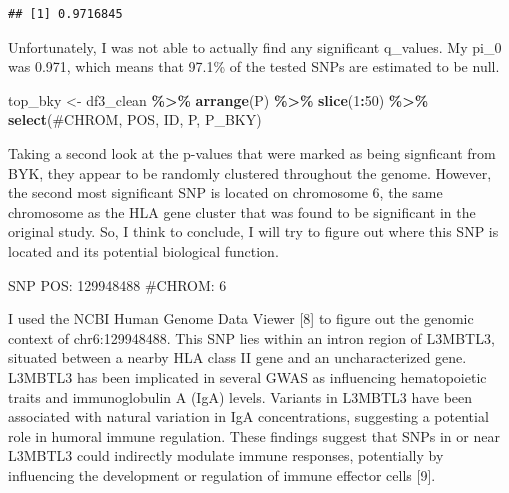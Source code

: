 \documentclass[
  12pt,
]{article}
\newenvironment{Shaded}{\begin{snugshade}}{\end{snugshade}}
\newcommand{\AttributeTok}[1]{\textcolor[rgb]{0.13,0.29,0.53}{#1}}
\newcommand{\DecValTok}[1]{\textcolor[rgb]{0.00,0.00,0.81}{#1}}
\newcommand{\FunctionTok}[1]{\textcolor[rgb]{0.13,0.29,0.53}{\textbf{#1}}}
\newcommand{\NormalTok}[1]{#1}
\newcommand{\OtherTok}[1]{\textcolor[rgb]{0.56,0.35,0.01}{#1}}
\newcommand{\SpecialCharTok}[1]{\textcolor[rgb]{0.81,0.36,0.00}{\textbf{#1}}}
\newcommand{\StringTok}[1]{\textcolor[rgb]{0.31,0.60,0.02}{#1}}
\begin{document}
\begin{Shaded}
\end{Shaded}

\begin{verbatim}
## [1] 0.9716845
\end{verbatim}

Unfortunately, I was not able to actually find any significant
q\_values. My pi\_0 was 0.971, which means that 97.1\% of the tested
SNPs are estimated to be null.

\begin{Shaded}
\begin{Highlighting}[]
\NormalTok{top\_bky }\OtherTok{\textless{}{-}}\NormalTok{ df3\_clean }\SpecialCharTok{\%\textgreater{}\%}
  \FunctionTok{arrange}\NormalTok{(P) }\SpecialCharTok{\%\textgreater{}\%}
  \FunctionTok{slice}\NormalTok{(}\DecValTok{1}\SpecialCharTok{:}\DecValTok{50}\NormalTok{) }\SpecialCharTok{\%\textgreater{}\%}
  \FunctionTok{select}\NormalTok{(}\StringTok{\textasciigrave{}}\AttributeTok{\#CHROM}\StringTok{\textasciigrave{}}\NormalTok{, POS, ID, P, P\_BKY)}
\end{Highlighting}
\end{Shaded}

Taking a second look at the p-values that were marked as being
signficant from BYK, they appear to be randomly clustered throughout the
genome. However, the second most significant SNP is located on
chromosome 6, the same chromosome as the HLA gene cluster that was found
to be significant in the original study. So, I think to conclude, I will
try to figure out where this SNP is located and its potential biological
function.

SNP POS: 129948488 \#CHROM: 6

I used the NCBI Human Genome Data Viewer {[}8{]} to figure out the
genomic context of chr6:129948488. This SNP lies within an intron region
of L3MBTL3, situated between a nearby HLA class II gene and an
uncharacterized gene. L3MBTL3 has been implicated in several GWAS as
influencing hematopoietic traits and immunoglobulin A (IgA) levels.
Variants in L3MBTL3 have been associated with natural variation in IgA
concentrations, suggesting a potential role in humoral immune
regulation. These findings suggest that SNPs in or near L3MBTL3 could
indirectly modulate immune responses, potentially by influencing the
development or regulation of immune effector cells {[}9{]}.
\end{document}
